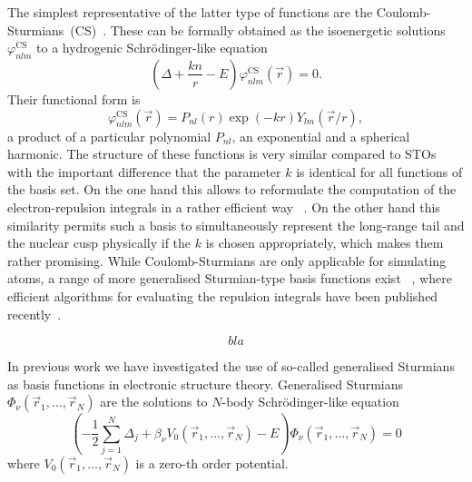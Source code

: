 The simplest representative of the latter type of functions
are the Coulomb-Sturmians~(CS)~\cite{Shull1959,Rotenberg1962,Rotenberg1970}.
These can be formally obtained as the isoenergetic solutions
$\varphi^\text{CS}_{nlm}$ to a hydrogenic Schrödinger-like equation
\begin{equation}
	\left( \Delta + \frac{k n}{r} - E \right) \varphi^\text{CS}_{nlm}(\vec{r}) = 0.
	\label{eqn:CS}
\end{equation}
Their functional form is
\begin{equation}
	\varphi^\text{CS}_{nlm}(\vec{r}) = P_{nl}(r) \exp(- k r) Y_{lm}\left(\vec{r} / r \right),
	\label{eqn:CSProduct}
\end{equation}
\ie a product of a particular polynomial $P_{nl}$,
an exponential and a spherical harmonic.
The structure of these functions is very similar compared to STOs
with the important difference that the parameter $k$ is identical for
all functions of the basis set.
On the one hand this allows to reformulate the computation
of the electron-repulsion integrals in a rather efficient way%
~\cite{Avery2011PhD,Avery2011}.
On the other hand this similarity permits such a basis to simultaneously
represent the long-range tail and the nuclear cusp physically
if the $k$ is chosen appropriately,
which makes them rather promising.
While Coulomb-Sturmians are only applicable for simulating atoms,
a range of more generalised Sturmian-type basis functions exist%
~\cite{Avery2011},
where efficient algorithms for evaluating the repulsion integrals
have been published recently~\cite{Avery2006,Avery2015,Morales2016,Avery2017}.


\begin{equation}
	bla
	\label{eqn:CSEquation}
\end{equation}



In previous work we have investigated the use of so-called generalised Sturmians as basis functions
in electronic structure theory.
%
\newcommand{\rpack}{\vec{r}_1, \ldots, \vec{r}_N}
Generalised Sturmians $\Phi_\nu(\rpack)$ are the solutions to $N$-body Schrödinger-like equation
\begin{equation}
	\left( -\frac12 \sum_{j=1}^N \Delta_j + \beta_\nu V_0(\rpack) - E \right) \Phi_\nu(\rpack) = 0
	\label{eqn:GenSturm}
\end{equation}
where $V_0(\rpack)$ is
a zero-th order potential.

